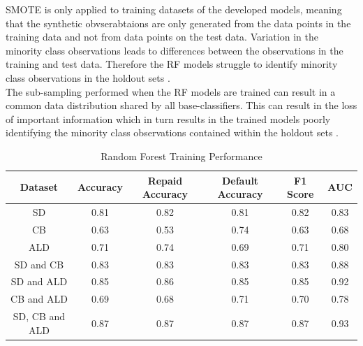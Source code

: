SMOTE is only applied to training datasets of the developed models, meaning that the synthetic obvserabtaions are only generated from the data points in the training data and not from data points on the test data. Variation in the minority class observations leads to differences between the observations in the training and test data. Therefore the RF models struggle to identify minority class observations in the holdout sets \parencite{NNShen}. \\

The sub-sampling performed when the RF models are trained can result in a common data distribution shared by all base-classifiers. This can result in the loss of important information which in turn results in the trained models poorly identifying the minority class observations contained within the holdout sets \parencite{Minority}. \\

\vspace{10pt}

\begin{table}[H]
\begin{center}
\begin{tabular}{|c|c|c|c|c|c|} 
\hline
\multicolumn{1}{|c|}{Dataset}
&\multicolumn{1}{|c|}{Accuracy}
&\multicolumn{1}{|c|}{Repaid Accuracy}
&\multicolumn{1}{|c|}{Default Accuracy}
&\multicolumn{1}{|c|}{F1 Score}
&\multicolumn{1}{|c|}{AUC}\\
\hline
SD & 0.81 & 0.82 & 0.81 & 0.82 & 0.83    \\
\hline
CB & 0.63 & 0.53 & 0.74 & 0.63 & 0.68    \\
\hline
ALD & 0.71 & 0.74 & 0.69 & 0.71 & 0.80    \\
\hline
SD and CB & 0.83 & 0.83 & 0.83 & 0.83 & 0.88    \\
\hline
SD and ALD & 0.85 & 0.86 & 0.85 & 0.85 & 0.92    \\
\hline
CB and ALD & 0.69 & 0.68 & 0.71 & 0.70 & 0.78    \\
\hline
SD, CB and ALD & 0.87 & 0.87 & 0.87 & 0.87 & 0.93    \\
\hline
\end{tabular}
\end{center}
\caption{Random Forest Training Performance}
\label{table:rf training}
\end{table}

\vspace{10pt}

